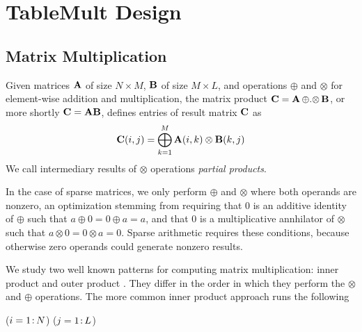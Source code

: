 
\section{TableMult Design}
\label{sDesign}


\subsection{Matrix Multiplication}
\label{sMatMul}
Given matrices $\mathbf{A}$ of size $N \times M$, $\mathbf{B}$ of size $M \times L$,
and operations $\oplus$ and $\otimes$ for element-wise addition and multiplication,
the matrix product $\mathbf{C} = \mathbf{A} \,{\oplus}.{\otimes}\, \mathbf{B} $, or more shortly $\mathbf{C} = \mathbf{A}\mathbf{B}$,
defines entries of result matrix $\mathbf{C}$ as 
\[ \mathbf{C}(i,j) = \bigoplus_{k=1}^M \mathbf{A}(i,k) \otimes \mathbf{B}(k,j) \]
We call intermediary results of $\otimes$ operations \emph{partial products}.

In the case of sparse matrices, we only perform $\oplus$ and $\otimes$ where both operands are nonzero,
an optimization stemming from requiring that 0 is an additive identity of $\oplus$ such that $a \oplus 0 = 0 \oplus a = a$,
and that 0 is a multiplicative annhilator of $\otimes$ such that $a \otimes 0 = 0 \otimes a = 0$.
Sparse arithmetic requires these conditions, because otherwise zero operands could generate nonzero results.



We study two well known patterns for computing matrix multiplication:
inner product and outer product \cite{kruskal1989techniques}. They differ in the order in which they perform
the $\otimes$ and $\oplus$ operations.  The more common inner product approach runs the following %

\removelatexerror
\begin{algorithm}[H]
\vspace{\algspace}
\fore($i = 1\colon\! N$){
\fore($j = 1\colon\! L$){
}}
\vspace{\algspace}
\end{algorithm}

